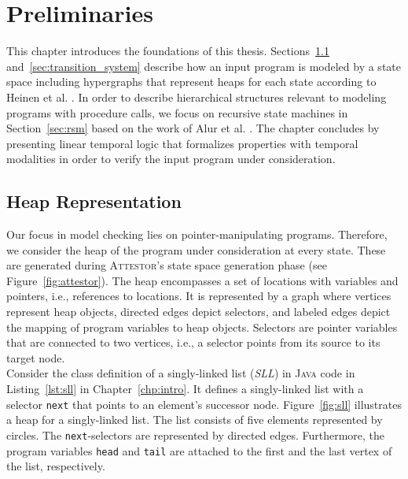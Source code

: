 \documentclass[a4paper, 12pt, twoside]{report}
\begin{document}
	\chapter{Preliminaries}\label{chp:preliminaries}
	
	This chapter introduces the foundations of this thesis. Sections~\ref{sec:heap} and~\ref{sec:transition_system} describe how an input program is modeled by a state space including hypergraphs that represent heaps for each state according to Heinen et al. \cite{heinen2015juggrnaut}. In order to describe hierarchical structures relevant to modeling programs with procedure calls, we focus on recursive state machines in Section~\ref{sec:rsm} based on the work of Alur et al. \cite{alur2001analysis}. The chapter concludes by presenting linear temporal logic that formalizes properties with temporal modalities in order to verify the input program under consideration.
	
	\section{Heap Representation}\label{sec:heap}	
	
	Our focus in model checking lies on pointer-manipulating programs. Therefore, we consider the heap of the program under consideration at every state. These are generated during \textsc{Attestor}'s state space generation phase (see Figure~\ref{fig:attestor}). The heap encompasses a set of locations with variables and pointers, i.e., references to locations. It is represented by a graph where vertices represent heap objects, directed edges depict selectors, and labeled edges depict the mapping of program variables to heap objects. Selectors are pointer variables that are connected to two vertices, i.e., a selector points from its source to its target node.\\
	
	
	Consider the class definition of a singly-linked list (\textit{SLL}) in \textsc{Java} code in Listing~\ref{lst:sll} in Chapter~\ref{chp:intro}. It defines a singly-linked list with a selector \texttt{next} that points to an element's successor node. Figure~\ref{fig:sll} illustrates a heap for a singly-linked list. The list consists of five elements represented by circles. The \texttt{next}-selectors are represented by directed edges. Furthermore, the program variables \texttt{head} and \texttt{tail} are attached to the first and the last vertex of the list, respectively.\\			
\end{document}
